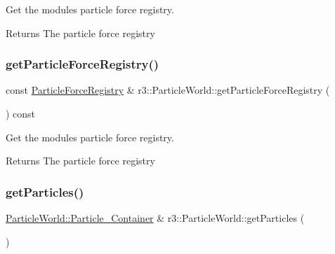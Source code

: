 Get the module\textquotesingle{}s particle force registry. 

\begin{DoxyReturn}{Returns}
The particle force registry 
\end{DoxyReturn}
\mbox{\label{classr3_1_1_particle_world_add0e006264e25065ff226eafc0c1a29d}} 
\subsubsection{\texorpdfstring{get\+Particle\+Force\+Registry()}{getParticleForceRegistry()}\hspace{0.1cm}{\footnotesize\ttfamily [2/2]}}
{\footnotesize\ttfamily const \mbox{\hyperlink{classr3_1_1_particle_force_registry}{Particle\+Force\+Registry}} \& r3\+::\+Particle\+World\+::get\+Particle\+Force\+Registry (\begin{DoxyParamCaption}{ }\end{DoxyParamCaption}) const}



Get the module\textquotesingle{}s particle force registry. 

\begin{DoxyReturn}{Returns}
The particle force registry 
\end{DoxyReturn}
\mbox{\label{classr3_1_1_particle_world_a00a5014002f28e35ebb59a3f8175db3c}} 
\subsubsection{\texorpdfstring{get\+Particles()}{getParticles()}\hspace{0.1cm}{\footnotesize\ttfamily [1/2]}}
{\footnotesize\ttfamily \mbox{\hyperlink{classr3_1_1_particle_world_aa354f6786c0837674fe8286f00465631}{Particle\+World\+::\+Particle\+\_\+\+Container}} \& r3\+::\+Particle\+World\+::get\+Particles (\begin{DoxyParamCaption}{ }\end{DoxyParamCaption})}



